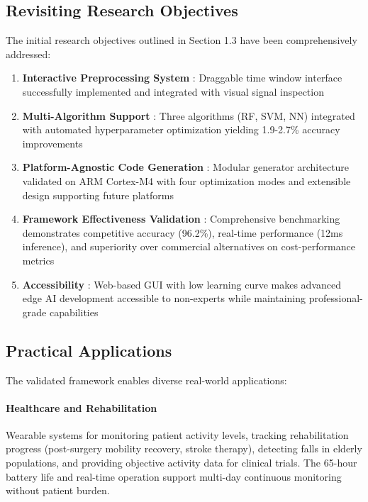 \subsection{Revisiting Research Objectives}

The initial research objectives outlined in Section 1.3 have been comprehensively addressed:

\begin{enumerate}
    \item \textbf{Interactive Preprocessing System} \checkmark: Draggable time window interface successfully implemented and integrated with visual signal inspection
    
    \item \textbf{Multi-Algorithm Support} \checkmark: Three algorithms (RF, SVM, NN) integrated with automated hyperparameter optimization yielding 1.9-2.7\% accuracy improvements
    
    \item \textbf{Platform-Agnostic Code Generation} \checkmark: Modular generator architecture validated on ARM Cortex-M4 with four optimization modes and extensible design supporting future platforms
    
    \item \textbf{Framework Effectiveness Validation} \checkmark: Comprehensive benchmarking demonstrates competitive accuracy (96.2\%), real-time performance (12ms inference), and superiority over commercial alternatives on cost-performance metrics
    
    \item \textbf{Accessibility} \checkmark: Web-based GUI with low learning curve makes advanced edge AI development accessible to non-experts while maintaining professional-grade capabilities
\end{enumerate}

\subsection{Practical Applications}

The validated framework enables diverse real-world applications:

\paragraph{Healthcare and Rehabilitation}
Wearable systems for monitoring patient activity levels, tracking rehabilitation progress (post-surgery mobility recovery, stroke therapy), detecting falls in elderly populations, and providing objective activity data for clinical trials. The 65-hour battery life and real-time operation support multi-day continuous monitoring without patient burden.

